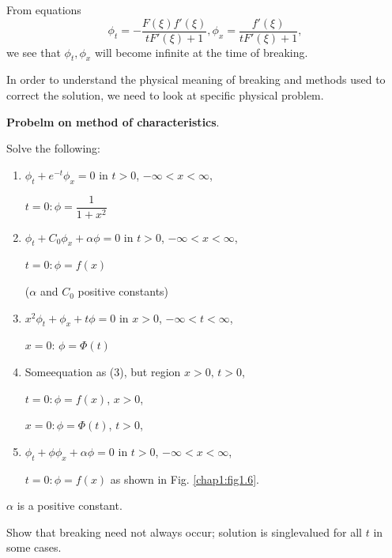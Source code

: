 From equations
$$
\phi_t= -\frac{F(\xi)f'(\xi)}{tF'(\xi)+1},\phi_x=\frac{f'(\xi)} {tF'(\xi)+1},
$$
we see that $\phi_t,\phi_x$ will become infinite at the time of breaking.

In order to understand the physical meaning of breaking and methods used to correct the solution, we need to look at specific physical problem.

\medskip\noindent
 {\bf \large Probelm on method of characteristics}.

Solve the following:
\begin{enumerate}
\item $\phi_t+e^{-t}\phi_x=0$ in $t>0$, $-\infty < x < \infty$,

$t=0:\phi=\dfrac{1}{1+x^{2}}$

\item $\phi_t+C_0 \phi_x+\alpha\phi=0$ in $t>0$, $-\infty < x < \infty$,

$t=0: \phi =f(x)$

($\alpha$ and $C_0$ positive constants)

\item $x^2 \phi_t+\phi_x+t\phi=0$ in $x>0$, $-\infty < t < \infty$,

$x=0$: $\phi=\Phi (t)$

\item Some\pageoriginale equation as (3), but region $x>0, \, t>0$,

$t=0:\phi=f(x)$, $x>0$,

$x=0:\phi =\Phi(t)$, $t>0$,

\item $\phi_t+\phi\phi_x+\alpha\phi=0$ in $t>0$, $-\infty < x < \infty$,

$t=0:\phi=f(x)$ as shown in Fig. \ref{chap1:fig1.6}.
\end{enumerate}

$\alpha$ is a positive constant.

Show that breaking need not always occur; \ie solution is singlevalued for all $t$ in some cases.
